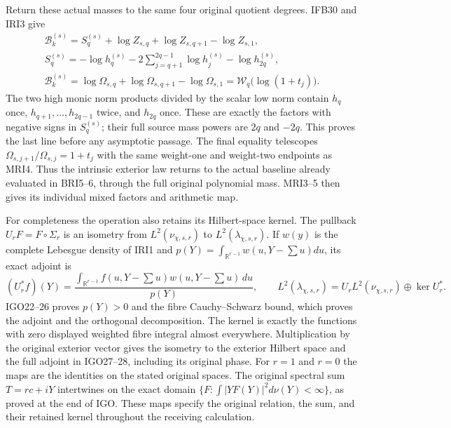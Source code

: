 \documentclass[11pt,a4paper]{article}
\begin{document}
Return these actual masses to the same four original quotient
degrees. IFB30 and IRI3 give
\[
\begin{gathered}
 \mathcal B_k^{(s)}
   =S_q^{(s)}+\log Z_{s,q}+\log Z_{s,q+1}-\log Z_{s,1},\\
 S_q^{(s)}=-\log h_q^{(s)}
       -2\sum_{j=q+1}^{2q-1}\log h_j^{(s)}-\log h_{2q}^{(s)},\\
 \mathcal B_k^{(s)}
   =\log\Omega_{s,q}+\log\Omega_{s,q+1}-\log\Omega_{s,1}
   =\mathcal W_q\bigl(\log(1+t_j)\bigr).
\end{gathered}\tag{IRI4}
\]
The two high monic norm products divided by the scalar low norm
contain $h_q$ once, $h_{q+1},\ldots,h_{2q-1}$ twice, and
$h_{2q}$ once. These are exactly the factors with negative signs
in $S_q^{(s)}$; their full source mass powers are $2q$ and $-2q$.
This proves the last line before any asymptotic passage. The final
equality telescopes $\Omega_{s,j+1}/\Omega_{s,j}=1+t_j$ with
the same weight-one and weight-two endpoints as MRI4. Thus the
intrinsic exterior law returns to the actual baseline already
evaluated in BRI5--6, through the full original polynomial mass.
MRI3--5 then gives its individual mixed factors and arithmetic map.

For completeness the operation also retains its Hilbert-space
kernel. The pullback $U_rF=F\circ\Sigma_r$ is an isometry from
$L^2(\nu_{\chi,s,r})$ to $L^2(\lambda_{\chi,s,r})$. If
$w(y)$ is the complete Lebesgue density of IRI1 and
$p(Y)=\int_{\mathbb R^{r-1}}w(u,Y-\sum u)du$, its exact adjoint is
\[
 (U_r^*f)(Y)=\frac{\int_{\mathbb R^{r-1}}
                 f(u,Y-\sum u)w(u,Y-\sum u)\,du}{p(Y)},
 \qquad
 L^2(\lambda_{\chi,s,r})
       =U_rL^2(\nu_{\chi,s,r})\oplus\ker U_r^*.
 \tag{IRI5}
\]
IGO22--26 proves $p(Y)>0$ and the fibre Cauchy--Schwarz bound,
which proves the adjoint and the orthogonal decomposition. The
kernel is exactly the functions with zero displayed weighted fibre
integral almost everywhere. Multiplication by the original exterior
vector gives the isometry to the exterior Hilbert space and the
full adjoint in IGO27--28, including its original phase. For $r=1$
and $r=0$ the maps are the identities on the stated original spaces.
The original spectral sum $T=rc+iY$ intertwines on the exact domain
$\{F:\int |YF(Y)|^2d\nu(Y)<\infty\}$, as proved at the end of IGO.
These maps specify the original relation, the sum, and their retained
kernel throughout the receiving calculation.
\end{document}
